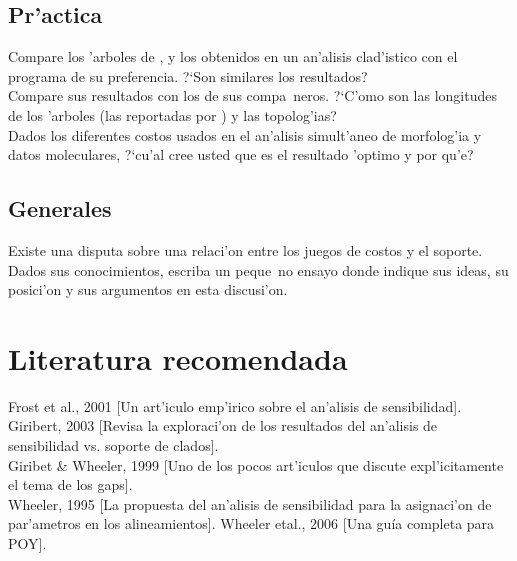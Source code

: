 \subsection{Pr'actica}
\noindent
Compare los 'arboles de ,  y los obtenidos en un an'alisis clad'istico con el programa de su  preferencia. ?`Son similares los resultados?\\
Compare sus resultados con los de sus compa~neros. ?`C'omo son las longitudes de los 'arboles (las reportadas por ) y las topolog'ias?\\
Dados los diferentes costos usados en el an'alisis simult'aneo de morfolog'ia y datos moleculares, 
 ?`cu'al cree usted que es el resultado 'optimo y por qu'e?
\subsection{Generales}
\noindent
Existe una disputa sobre una relaci'on entre los juegos de costos y el soporte. Dados sus conocimientos, escriba un 
peque~no ensayo donde indique sus ideas, su posici'on y sus argumentos en esta discusi'on.
\section{Literatura recomendada}
\noindent
Frost et al., 2001 [Un art'iculo emp'irico sobre el an'alisis de sensibilidad].\\
Giribert, 2003 [Revisa la exploraci'on de los resultados del an'alisis de sensibilidad vs. soporte de clados].\\
Giribet \& Wheeler, 1999 [Uno de los pocos art'iculos que discute expl'icitamente el tema de los gaps].\\
Wheeler, 1995 [La propuesta del an'alisis de sensibilidad para la asignaci'on de par'ametros en los alineamientos].
Wheeler etal., 2006 [Una gu\'ia completa para POY].